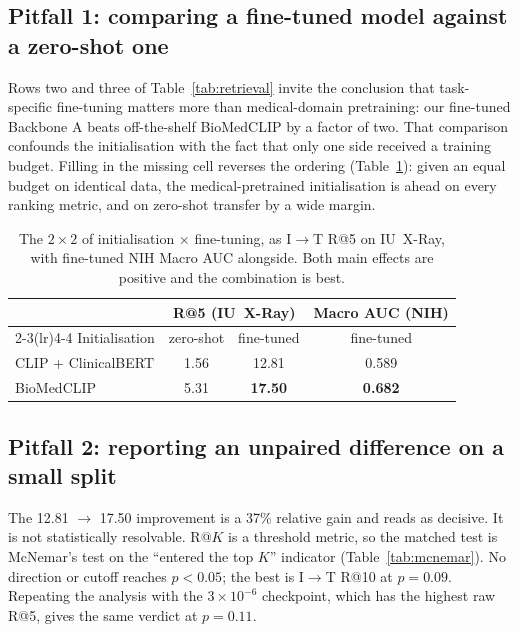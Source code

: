 \documentclass[runningheads]{llncs}
\begin{document}
\subsection{Pitfall 1: comparing a fine-tuned model against a zero-shot one}

Rows two and three of Table~\ref{tab:retrieval} invite the conclusion that
task-specific fine-tuning matters more than medical-domain pretraining: our
fine-tuned Backbone A beats off-the-shelf BioMedCLIP by a factor of two. That
comparison confounds the initialisation with the fact that only one side
received a training budget. Filling in the missing cell reverses the ordering
(Table~\ref{tab:twobytwo}): given an equal budget on identical data, the
medical-pretrained initialisation is ahead on every ranking metric, and on
zero-shot transfer by a wide margin.

\begin{table}[t]
\centering
\caption{The $2\times2$ of initialisation $\times$ fine-tuning, as I$\rightarrow$T
R@5 on IU~X-Ray, with fine-tuned NIH Macro AUC alongside. Both main effects are
positive and the combination is best.}
\label{tab:twobytwo}
\begin{tabular}{lccc}
\toprule
& \multicolumn{2}{c}{R@5 (IU~X-Ray)} & Macro AUC (NIH) \\
\cmidrule(lr){2-3}\cmidrule(lr){4-4}
Initialisation & zero-shot & fine-tuned & fine-tuned \\
\midrule
CLIP + ClinicalBERT & 1.56 & 12.81 & 0.589 \\
BioMedCLIP          & 5.31 & \textbf{17.50} & \textbf{0.682} \\
\bottomrule
\end{tabular}
\end{table}

\subsection{Pitfall 2: reporting an unpaired difference on a small split}

The 12.81 $\rightarrow$ 17.50 improvement is a 37\% relative gain and reads as
decisive. It is not statistically resolvable. R@$K$ is a threshold metric, so the
matched test is McNemar's test on the ``entered the top $K$'' indicator
(Table~\ref{tab:mcnemar}). No direction or cutoff reaches $p<0.05$; the best is
I$\rightarrow$T R@10 at $p=0.09$. Repeating the analysis with the
$3\!\times\!10^{-6}$ checkpoint, which has the highest raw R@5, gives the same
verdict at $p=0.11$.
\end{document}
